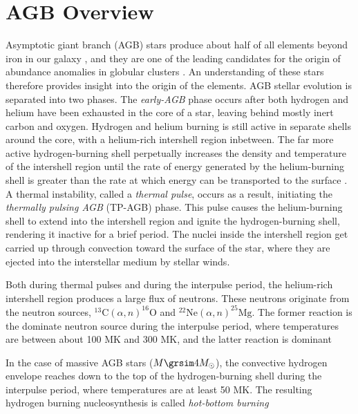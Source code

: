 \section{AGB Overview}
Asymptotic giant branch (AGB) stars produce about half of all elements beyond iron in our galaxy \cite{Busso1999}, and they are one of the leading candidates for the origin of abundance anomalies in globular clusters \cite{Prantzos2007}. An understanding of these stars therefore provides insight into the origin of the elements. AGB stellar evolution is separated into two phases. The \emph{early-AGB} phase occurs after both hydrogen and helium have been exhausted in the core of a star, leaving behind mostly inert carbon and oxygen. Hydrogen and helium burning is still active in separate shells around the core, with a helium-rich intershell region inbetween. The far more active hydrogen-burning shell perpetually increases the density and temperature of the intershell region until the rate of energy generated by the helium-burning shell is greater than the rate at which energy can be transported to the surface \cite{Iliadis2015}. A thermal instability, called a \emph{thermal pulse}, occurs as a result, initiating the \emph{thermally pulsing AGB} (TP-AGB) phase. This pulse causes the helium-burning shell to extend into the intershell region and ignite the hydrogen-burning shell, rendering it inactive for a brief period. The nuclei inside the intershell region get carried up through convection toward the surface of the star, where they are ejected into the interstellar medium by stellar winds. 

Both during thermal pulses and during the interpulse period, the helium-rich intershell region produces a large flux of neutrons. These neutrons originate from the neutron sources, $^{13}\mathrm{C}(\alpha,n)^{16}\mathrm{O}$ and $^{22}\mathrm{Ne}(\alpha,n)^{25}\mathrm{Mg}$. The former reaction is the dominate neutron source during the interpulse period, where temperatures are between about 100 MK and 300 MK, and the latter reaction is dominant 

In the case of massive AGB stars ($M \grsim 4 M_{\odot}$), the convective hydrogen envelope reaches down to the top of the hydrogen-burning shell during the interpulse period, where temperatures are at least 50 MK. The resulting hydrogen burning nucleosynthesis is called \emph{hot-bottom burning}

